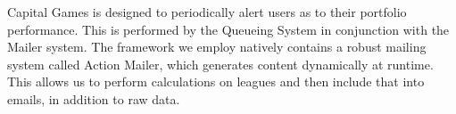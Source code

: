 Capital Games is designed to periodically alert users as to their portfolio performance.
This is performed by the Queueing System in conjunction with the Mailer system.
The framework we employ natively contains a robust mailing system called Action Mailer,
which generates content dynamically at runtime. \cite{action:mailer} This allows us to perform calculations
on leagues and then include that into emails, in addition to raw data.

%
%
%
%
%
%
%
%
